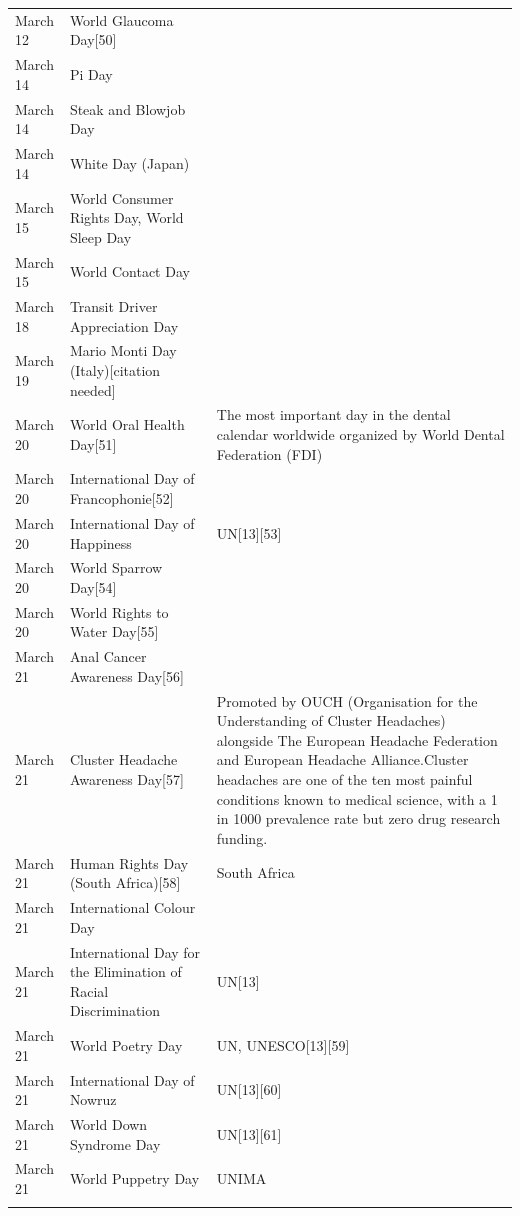 \documentclass[
  openany]{book}
\begin{document}
\begin{longtable}[t]{>{\raggedright\arraybackslash}p{8em}>{\raggedright\arraybackslash}p{20em}>{\raggedright\arraybackslash}p{12em}}
\rowcolor{gray!6}  March 12 & World Glaucoma Day[50] & \\
March 14 & Pi Day & \\
\addlinespace
\rowcolor{gray!6}  March 14 & Steak and Blowjob Day & \\
March 14 & White Day (Japan) & \\
\rowcolor{gray!6}  March 15 & World Consumer Rights Day, World Sleep Day & \\
March 15 & World Contact Day & \\
\rowcolor{gray!6}  March 18 & Transit Driver Appreciation Day & \\
\addlinespace
March 19 & Mario Monti Day (Italy)[citation needed] & \\
\rowcolor{gray!6}  March 20 & World Oral Health Day[51] & The most important day in the dental calendar worldwide organized by World Dental Federation (FDI)\\
March 20 & International Day of Francophonie[52] & \\
\rowcolor{gray!6}  March 20 & International Day of Happiness & UN[13][53]\\
March 20 & World Sparrow Day[54] & \\
\addlinespace
\rowcolor{gray!6}  March 20 & World Rights to Water Day[55] & \\
March 21 & Anal Cancer Awareness Day[56] & \\
\rowcolor{gray!6}  March 21 & Cluster Headache Awareness Day[57] & Promoted by OUCH (Organisation for the Understanding of Cluster Headaches) alongside The European Headache Federation and European Headache Alliance.Cluster headaches are one of the ten most painful conditions known to medical science, with a 1 in 1000 prevalence rate but zero drug research funding.\\
March 21 & Human Rights Day (South Africa)[58] & South Africa\\
\rowcolor{gray!6}  March 21 & International Colour Day & \\
\addlinespace
March 21 & International Day for the Elimination of Racial Discrimination & UN[13]\\
\rowcolor{gray!6}  March 21 & World Poetry Day & UN, UNESCO[13][59]\\
March 21 & International Day of Nowruz & UN[13][60]\\
\rowcolor{gray!6}  March 21 & World Down Syndrome Day & UN[13][61]\\
March 21 & World Puppetry Day & UNIMA\\
\addlinespace

\end{longtable}
\end{document}
